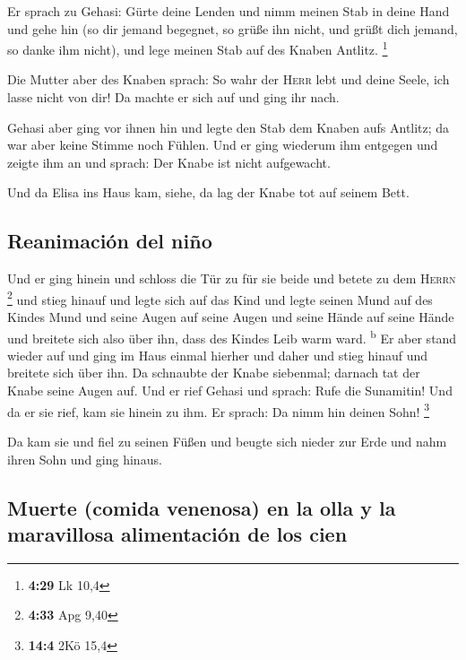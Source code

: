  Er sprach zu Gehasi: Gürte deine Lenden und nimm meinen
Stab in deine Hand und gehe hin (so dir jemand begegnet, so grüße ihn
nicht, und grüßt dich jemand, so danke ihm nicht), und lege meinen Stab
auf des Knaben Antlitz. \footnote{\textbf{4:29} Lk 10,4}

 Die Mutter aber des Knaben sprach: So wahr der
\textsc{Herr} lebt und deine Seele, ich lasse nicht von dir! Da machte
er sich auf und ging ihr nach.

 Gehasi aber ging vor ihnen hin und legte den Stab dem
Knaben aufs Antlitz; da war aber keine Stimme noch Fühlen. Und er ging
wiederum ihm entgegen und zeigte ihm an und sprach: Der Knabe ist nicht
aufgewacht.

 Und da Elisa ins Haus kam, siehe, da lag der Knabe tot
auf seinem Bett.

\hypertarget{reanimaciuxf3n-del-niuxf1o}{%
\subsection{Reanimación del niño}\label{reanimaciuxf3n-del-niuxf1o}}

 Und er ging hinein und schloss die Tür zu für sie beide
und betete zu dem \textsc{Herrn} \footnote{\textbf{4:33} Apg 9,40}
 und stieg hinauf und legte sich auf das Kind und legte
seinen Mund auf des Kindes Mund und seine Augen auf seine Augen und
seine Hände auf seine Hände und breitete sich also über ihn, dass des
Kindes Leib warm ward. \textsuperscript{b}  Er aber stand
wieder auf und ging im Haus einmal hierher und daher und stieg hinauf
und breitete sich über ihn. Da schnaubte der Knabe siebenmal; darnach
tat der Knabe seine Augen auf.  Und er rief Gehasi und
sprach: Rufe die Sunamitin! Und da er sie rief, kam sie hinein zu ihm.
Er sprach: Da nimm hin deinen Sohn! \footnote{\textbf{14:4} 2Kö 15,4}

 Da kam sie und fiel zu seinen Füßen und beugte sich
nieder zur Erde und nahm ihren Sohn und ging hinaus.

\hypertarget{muerte-comida-venenosa-en-la-olla-y-la-maravillosa-alimentaciuxf3n-de-los-cien}{%
\subsection{Muerte (comida venenosa) en la olla y la maravillosa
alimentación de los
cien}\label{muerte-comida-venenosa-en-la-olla-y-la-maravillosa-alimentaciuxf3n-de-los-cien}}

